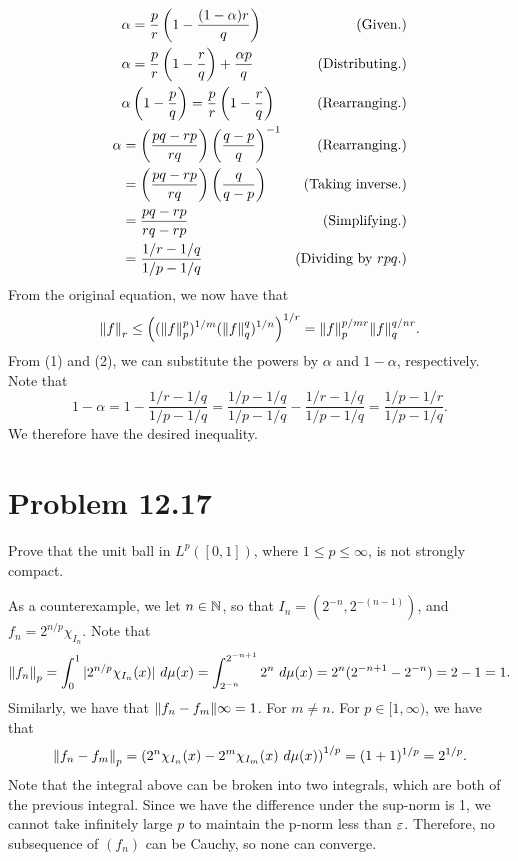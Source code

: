 \begin{solution}
    \tightalignbreak
    \begin{align*}
        &\alpha = \frac{p}{r}\left(1 - \frac{(1 - \alpha)r}{q}\right)&\text{(Given.)}\\
        &\alpha = \frac{p}{r}\left( 1 - \frac{r}{q}\right) + \frac{\alpha p}{q} &\text{(Distributing.)}\\
        &\alpha\left( 1 - \frac{p}{q} \right) = \frac{p}{r}\left(1 - \frac{r}{q}\right) &\text{(Rearranging.)}\\
        \alpha &= \left( \frac{pq - rp}{rq}\right)\left( \frac{q - p}{q}\right)^{-1} &\text{(Rearranging.)}\\
        &= \left( \frac{pq - rp}{rq}\right)\left( \frac{q}{q - p}\right) &\text{(Taking inverse.)}\\
        &= \frac{pq - rp}{rq - rp} &\text{(Simplifying.)}\\
        &= \frac{1/r - 1/q}{1/p-1/q} &\text{(Dividing by $rpq$.)}
    \end{align*}
    \vspace{-12mm}\alignbreak
    From the original equation, we now have that 
    \[\norm{f}_r \leq \left((\norm{f}^p_p)^{1/m} (\norm{f}_q^q)^{1/n}\right)^{1/r} = \norm{f}_p^{p/mr}\norm{f}_q^{q/nr}.\]
    From (1) and (2), we can substitute the powers by $\alpha$ and $1 - \alpha$, respectively. Note that
    \[1 - \alpha = 1 - \frac{1/r-1/q}{1/p - 1/q} = \frac{1/p-1/q}{1/p-1/q} - \frac{1/r-1/q}{1/p - 1/q} = \frac{1/p - 1/r}{1/p - 1/q}.\]
    We therefore have the desired inequality. 
\end{solution}

\newpage
\section{Problem 12.17}
Prove that the unit ball in $L^p([0, 1])$, where $1 \leq p \leq \infty$, is not strongly compact.
\partbreak
\begin{solution}

    As a counterexample, we let $n \in \mathbb{N}$, so that $I_n = (2^{-n}, 2^{-(n-1)})$, and $f_n = 2^{n/p}\chi_{I_n}.$ Note that 
    \[\norm{f_n}_p = \int_0^1 |2^{n/p}\chi_{I_n}(x)| \ d\mu(x) = \int^{2^{-n+1}}_{2^{-n}} 2^n \ d\mu(x) = 2^n(2^{-n+1} - 2^{-n}) = 2 - 1 = 1.\]
    Similarly, we have that $\norm{f_n - f_m}\infty = 1$. For $m \neq n$. For $p \in [1, \infty)$, we have that
    \[\norm{f_n - f_m}_p = \left(2^n \chi_{I_n}(x) - 2^m \chi_{I_m}(x) \ d\mu(x)\right)^{1/p} = (1 + 1)^{1/p} = 2^{1/p}.\]
    Note that the integral above can be broken into two integrals, which are both of the previous integral. Since we have the difference under the sup-norm is 1, we cannot take infinitely large $p$ to maintain the p-norm less than $\varepsilon$. Therefore, no subsequence of $(f_n)$ can be Cauchy, so none can converge. 
\end{solution}



